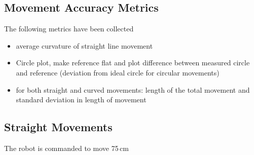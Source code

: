 \subsection{Movement Accuracy Metrics}
The following metrics have been collected

\begin{itemize}
	\item average curvature of straight line movement
	\item Circle plot, make reference flat and plot difference between measured circle and reference (deviation from ideal circle for circular movements)
	\item for both straight and curved movements: length of the total movement and  standard deviation in length of movement
\end{itemize}


\subsection{Straight Movements}

The robot is commanded to move 75\,cm

